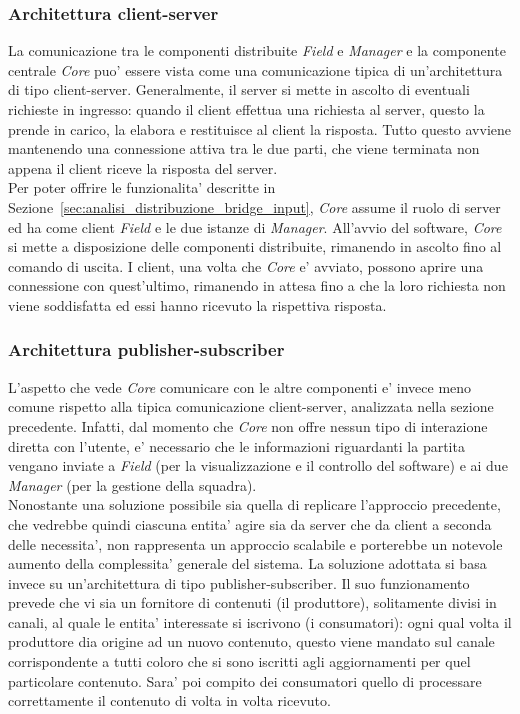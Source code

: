 \subsubsection{Architettura client-server}
\label{sec:analisi_client_server}

La comunicazione tra le componenti distribuite \textit{Field} e \textit{Manager} e la componente centrale \textit{Core} puo' essere vista come una comunicazione tipica di un'architettura di tipo client-server. Generalmente, il server si mette in ascolto di eventuali richieste in ingresso: quando il client effettua una richiesta al server, questo la prende in carico, la elabora e restituisce al client la risposta. Tutto questo avviene mantenendo una connessione attiva tra le due parti, che viene terminata non appena il client riceve la risposta del server.\\

Per poter offrire le funzionalita' descritte in Sezione~\ref{sec:analisi_distribuzione_bridge_input}, \textit{Core} assume il ruolo di server ed ha come client \textit{Field} e le due istanze di \textit{Manager}. All'avvio del software, \textit{Core} si mette a disposizione delle componenti distribuite, rimanendo in ascolto fino al comando di uscita. I client, una volta che \textit{Core} e' avviato, possono aprire una connessione con quest'ultimo, rimanendo in attesa fino a che la loro richiesta non viene soddisfatta ed essi hanno ricevuto la rispettiva risposta.

\subsubsection{Architettura publisher-subscriber}
\label{sec:analisi_client_pusblisher_subscriber}

L'aspetto che vede \textit{Core} comunicare con le altre componenti e' invece meno comune rispetto alla tipica comunicazione client-server, analizzata nella sezione precedente. Infatti, dal momento che \textit{Core} non offre nessun tipo di interazione diretta con l'utente, e' necessario che le informazioni riguardanti la partita vengano inviate a \textit{Field} (per la visualizzazione e il controllo del software) e ai due \textit{Manager} (per la gestione della squadra).\\

Nonostante una soluzione possibile sia quella di replicare l'approccio precedente, che vedrebbe quindi ciascuna entita' agire sia da server che da client a seconda delle necessita', non rappresenta un approccio scalabile e porterebbe un notevole aumento della complessita' generale del sistema. La soluzione adottata si basa invece su un'architettura di tipo publisher-subscriber. Il suo funzionamento prevede che vi sia un fornitore di contenuti (il produttore), solitamente divisi in canali, al quale le entita' interessate si iscrivono (i consumatori): ogni qual volta il produttore dia origine ad un nuovo contenuto, questo viene mandato sul canale corrispondente a tutti coloro che si sono iscritti agli aggiornamenti per quel particolare contenuto. Sara' poi compito dei consumatori quello di processare correttamente il contenuto di volta in volta ricevuto.\\

